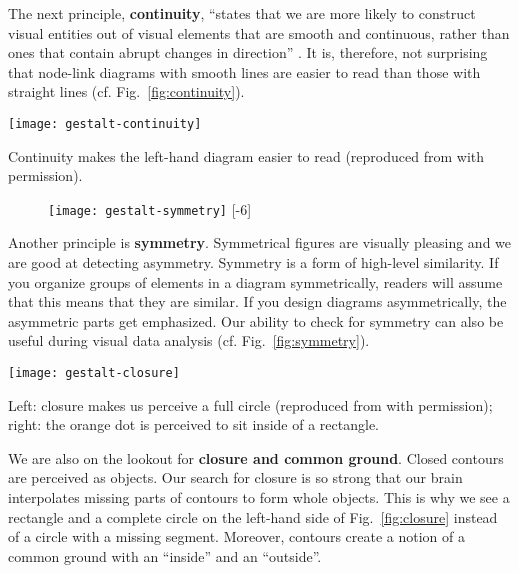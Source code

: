 The next principle, \textbf{continuity}, ``states that we are more likely to construct visual entities out of visual elements that are smooth and continuous, rather than ones that contain abrupt changes in direction'' \cite{Ware12}. It is, therefore, not surprising that node-link diagrams with smooth lines are easier to read than those with straight lines (cf. Fig.~\ref{fig:continuity}).

\begin{marginfigure}[-1\baselineskip]
\centering
\texttt{[image: gestalt-continuity]}
\caption{\label{fig:continuity} Continuity makes the left-hand diagram easier to read (reproduced from \cite{Ware12} with permission).}
\end{marginfigure}

\begin{figure}
\centering
\texttt{[image: gestalt-symmetry]}
[-6\baselineskip]
\end{figure}

Another principle is \textbf{symmetry}. Symmetrical figures are visually pleasing and we are good at detecting asymmetry. Symmetry is a form of high-level similarity. If you organize groups of elements in a diagram symmetrically, readers will assume that this means that they are similar. If you design diagrams asymmetrically, the asymmetric parts get emphasized. Our ability to check for symmetry can also be useful during visual data analysis (cf. Fig.~\ref{fig:symmetry}).

\begin{marginfigure}
\centering
\texttt{[image: gestalt-closure]}
\caption{\label{fig:closure} Left: closure makes us perceive a full circle (reproduced from \cite{Ware12} with permission); right: the orange dot is perceived to sit inside of a rectangle.}
\end{marginfigure}

We are also on the lookout for \textbf{closure and common ground}. Closed contours are perceived as objects. Our search for closure is so strong that our brain interpolates missing parts of contours to form whole objects. This is why we see a rectangle and a complete circle on the left-hand side of Fig.~\ref{fig:closure} instead of a circle with a missing segment. Moreover, contours create a notion of a common ground with an ``inside'' and an ``outside''.

